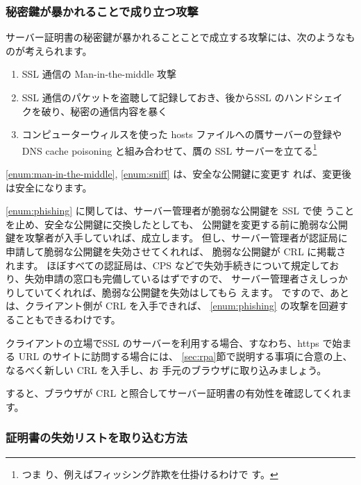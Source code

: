 \documentclass[mingoth,a4paper]{jsarticle}
\begin{document}
\subsubsection{秘密鍵が暴かれることで成り立つ攻撃}
サーバー証明書の秘密鍵が暴かれることことで成立する攻撃には、次のようなも
のが考えられます。
\begin{enumerate}
\item SSL 通信の Man-in-the-middle 攻撃\label{enum:man-in-the-middle}
\item SSL 通信のパケットを盗聴して記録しておき、後からSSL のハンドシェイ
      クを破り、秘密の通信内容を暴く\label{enum:sniff}
\item コンピューターウィルスを使った hosts
      ファイルへの贋サーバーの登録や DNS cache poisoning と組み合わせて、贋の SSL サーバーを立てる\footnote{つま
      り、例えばフィッシング詐欺を仕掛けるわけで
      す。}\label{enum:phishing}
\end{enumerate}

\ref{enum:man-in-the-middle},  \ref{enum:sniff} は、安全な公開鍵に変更す
れば、変更後は安全になります。

\ref{enum:phishing} に関しては、サーバー管理者が脆弱な公開鍵を SSL で使
うことを止め、安全な公開鍵に交換したとしても、
公開鍵を変更する前に脆弱な公開鍵を攻撃者が入手していれば、成立します。
但し、サーバー管理者が認証局に申請して脆弱な公開鍵を失効させてくれれば、
脆弱な公開鍵が CRL に掲載されます。
ほぼすべての認証局は、CPS などで失効手続きについて規定してお
り、失効申請の窓口も完備しているはずですので、
サーバー管理者さえしっかりしていてくれれば、脆弱な公開鍵を失効はしてもら
えます。
ですので、あとは、クライアント側が CRL を入手できれば、
\ref{enum:phishing} の攻撃を回避することもできるわけです。

クライアントの立場でSSL のサーバーを利用する場合、すなわち、https で始ま
る URL のサイトに訪問する場合には、
\ref{sec:rpa}節で説明する事項に合意の上、なるべく新しい CRL を入手し、お
手元のブラウザに取り込みましょう。

すると、ブラウザが CRL と照合してサーバー証明書の有効性を確認してくれま
す。

\subsubsection{証明書の失効リストを取り込む方法}
\end{document}
